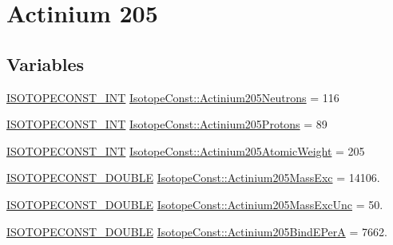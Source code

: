 \hypertarget{group___isotope_const-_actinium-_ac205}{}\section{Actinium 205}
\label{group___isotope_const-_actinium-_ac205}
\subsection*{Variables}
\begin{DoxyCompactItemize}
\item 
\mbox{\hyperlink{group___isotope_const-_macros_ga5f18360b3e99483a35c32d789e62621c}{I\+S\+O\+T\+O\+P\+E\+C\+O\+N\+S\+T\+\_\+\+I\+NT}} \mbox{\hyperlink{group___isotope_const-_actinium-_ac205_ga923de79b2759e9ba5d0cea63893fb83b}{Isotope\+Const\+::\+Actinium205\+Neutrons}} = 116
\item 
\mbox{\hyperlink{group___isotope_const-_macros_ga5f18360b3e99483a35c32d789e62621c}{I\+S\+O\+T\+O\+P\+E\+C\+O\+N\+S\+T\+\_\+\+I\+NT}} \mbox{\hyperlink{group___isotope_const-_actinium-_ac205_ga3e3380d44ca44f139477296363ccd06a}{Isotope\+Const\+::\+Actinium205\+Protons}} = 89
\item 
\mbox{\hyperlink{group___isotope_const-_macros_ga5f18360b3e99483a35c32d789e62621c}{I\+S\+O\+T\+O\+P\+E\+C\+O\+N\+S\+T\+\_\+\+I\+NT}} \mbox{\hyperlink{group___isotope_const-_actinium-_ac205_ga76f747606c4381026b09144a704429ac}{Isotope\+Const\+::\+Actinium205\+Atomic\+Weight}} = 205
\item 
\mbox{\hyperlink{group___isotope_const-_macros_ga8f45a7272ce02c0b4c65c44636ed719a}{I\+S\+O\+T\+O\+P\+E\+C\+O\+N\+S\+T\+\_\+\+D\+O\+U\+B\+LE}} \mbox{\hyperlink{group___isotope_const-_actinium-_ac205_gad5b1b4ea3aa266eec0920c8d05ba5283}{Isotope\+Const\+::\+Actinium205\+Mass\+Exc}} = 14106.
\item 
\mbox{\hyperlink{group___isotope_const-_macros_ga8f45a7272ce02c0b4c65c44636ed719a}{I\+S\+O\+T\+O\+P\+E\+C\+O\+N\+S\+T\+\_\+\+D\+O\+U\+B\+LE}} \mbox{\hyperlink{group___isotope_const-_actinium-_ac205_ga44d610eeabddb3d539a2736239585501}{Isotope\+Const\+::\+Actinium205\+Mass\+Exc\+Unc}} = 50.
\item 
\mbox{\hyperlink{group___isotope_const-_macros_ga8f45a7272ce02c0b4c65c44636ed719a}{I\+S\+O\+T\+O\+P\+E\+C\+O\+N\+S\+T\+\_\+\+D\+O\+U\+B\+LE}} \mbox{\hyperlink{group___isotope_const-_actinium-_ac205_gacfca3d78bf9fd2da7a921c4a5985a008}{Isotope\+Const\+::\+Actinium205\+Bind\+E\+PerA}} = 7662.
\item 

\end{DoxyCompactItemize}
